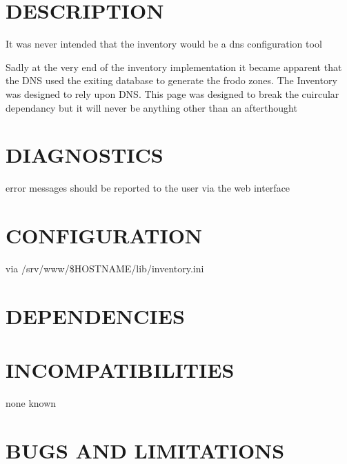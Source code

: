 \documentclass{book}
\begin{document}
\section{DESCRIPTION}
\label{_DESCRIPTION}
\hypertarget{_DESCRIPTION}{}



It was never intended that the inventory would be a dns configuration tool



Sadly at the very end of the inventory implementation it became apparent that the DNS used the exiting database to generate the frodo zones. The Inventory was designed to rely upon DNS. This page was designed to break the cuircular dependancy but it will never be anything other than an afterthought


\section{DIAGNOSTICS}
\label{_DIAGNOSTICS}
\hypertarget{_DIAGNOSTICS}{}



error messages should be reported to the user via the web interface


\section{CONFIGURATION}
\label{_CONFIGURATION}
\hypertarget{_CONFIGURATION}{}



via /srv/www/\$HOSTNAME/lib/inventory.ini


\section{DEPENDENCIES}
\label{_DEPENDENCIES}
\hypertarget{_DEPENDENCIES}{}


\section{INCOMPATIBILITIES}
\label{_INCOMPATIBILITIES}
\hypertarget{_INCOMPATIBILITIES}{}



none known


\section{BUGS AND LIMITATIONS}
\label{_BUGS_AND_LIMITATIONS}
\hypertarget{_BUGS_AND_LIMITATIONS}{}
\end{document}
